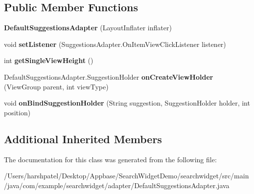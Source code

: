 \subsection*{Public Member Functions}
\begin{DoxyCompactItemize}
\item 
\mbox{\label{classcom_1_1example_1_1searchwidget_1_1adapter_1_1_default_suggestions_adapter_a461be37f2d68a841f7c97eed7831596a}} 
{\bfseries Default\+Suggestions\+Adapter} (Layout\+Inflater inflater)
\item 
\mbox{\label{classcom_1_1example_1_1searchwidget_1_1adapter_1_1_default_suggestions_adapter_ab8e3e91b57b5a9854df9335a575fc064}} 
void {\bfseries set\+Listener} (Suggestions\+Adapter.\+On\+Item\+View\+Click\+Listener listener)
\item 
\mbox{\label{classcom_1_1example_1_1searchwidget_1_1adapter_1_1_default_suggestions_adapter_ae6a5c5a45fc619e5f57678ff8cfa6ed8}} 
int {\bfseries get\+Single\+View\+Height} ()
\item 
\mbox{\label{classcom_1_1example_1_1searchwidget_1_1adapter_1_1_default_suggestions_adapter_a9c220e8cda8dcb13b19353cc5999f253}} 
Default\+Suggestions\+Adapter.\+Suggestion\+Holder {\bfseries on\+Create\+View\+Holder} (View\+Group parent, int view\+Type)
\item 
\mbox{\label{classcom_1_1example_1_1searchwidget_1_1adapter_1_1_default_suggestions_adapter_a58949f766bce74a4cb9c9c2567f82ec9}} 
void {\bfseries on\+Bind\+Suggestion\+Holder} (String suggestion, Suggestion\+Holder holder, int position)
\end{DoxyCompactItemize}
\subsection*{Additional Inherited Members}


The documentation for this class was generated from the following file\+:\begin{DoxyCompactItemize}
\item 
/\+Users/harshpatel/\+Desktop/\+Appbase/\+Search\+Widget\+Demo/searchwidget/src/main/java/com/example/searchwidget/adapter/Default\+Suggestions\+Adapter.\+java\end{DoxyCompactItemize}
